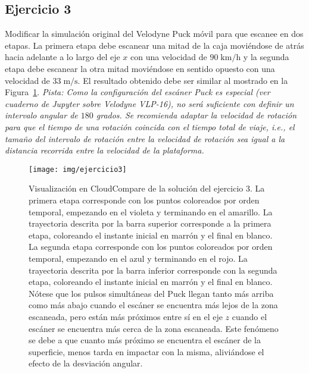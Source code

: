 \documentclass[]{article}
\begin{document}
	\subsection*{Ejercicio 3}
	Modificar la simulación original del Velodyne Puck móvil para que escanee en dos etapas. La primera etapa debe escanear una mitad de la caja moviéndose de atrás hacia adelante a lo largo del eje $x$ con una velocidad de $90\;\mathrm{km}/\mathrm{h}$ y la segunda etapa debe escanear la otra mitad moviéndose en sentido opuesto con una velocidad de $33\;\mathrm{m}/\mathrm{s}$. El resultado obtenido debe ser similar al mostrado en la Figura~\ref{fig:ejercicio3}. \textit{Pista: Como la configuración del escáner Puck es especial (ver cuaderno de Jupyter sobre Velodyne VLP-16), no será suficiente con definir un intervalo angular de $180$ grados. Se recomienda adaptar la velocidad de rotación para que el tiempo de una rotación coincida con el tiempo total de viaje, i.e., el tamaño del intervalo de rotación entre la velocidad de rotación sea igual a la distancia recorrida entre la velocidad de la plataforma.}
	
	\begin{figure}[htb]
		\centering
		\texttt{[image: img/ejercicio3]}
		\caption{Visualización en CloudCompare de la solución del ejercicio 3. La primera etapa corresponde con los puntos coloreados por orden temporal, empezando en el violeta y terminando en el amarillo. La trayectoria descrita por la barra superior corresponde a la primera etapa, coloreando el instante inicial en marrón y el final en blanco. La segunda etapa corresponde con los puntos coloreados por orden temporal, empezando en el azul y terminando en el rojo. La trayectoria descrita por la barra inferior corresponde con la segunda etapa, coloreando el instante inicial en marrón y el final en blanco. Nótese que los pulsos simultáneas del Puck llegan tanto más arriba como más abajo cuando el escáner se encuentra más lejos de la zona escaneada, pero están más próximos entre sí en el eje $z$ cuando el escáner se encuentra más cerca de la zona escaneada. Este fenómeno se debe a que cuanto más próximo se encuentra el escáner de la superficie, menos tarda en impactar con la misma, aliviándose el efecto de la desviación angular.}
		\label{fig:ejercicio3}
	\end{figure} 


	\pagebreak
	
\end{document}
